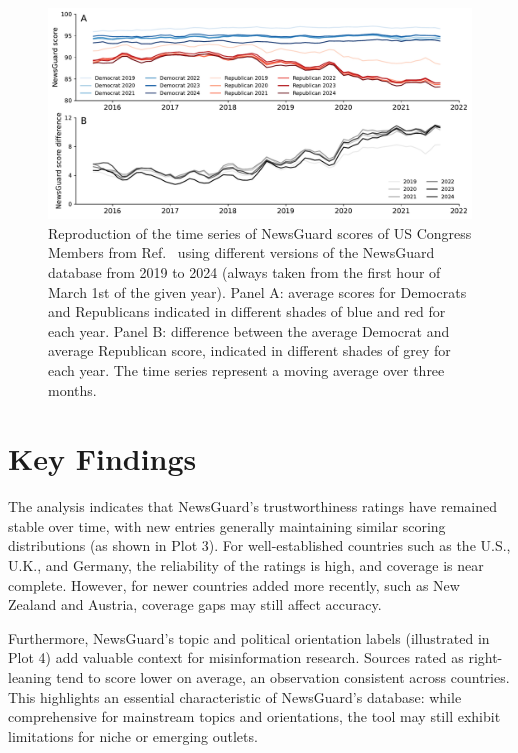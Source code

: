 \documentclass{article}
\begin{document}
\begin{figure}[H]
    \centering
    \includegraphics[width=\textwidth]{figures/politician_trustworthiness_replication_score_difference.pdf}
    \caption{Reproduction of the time series of NewsGuard scores of US Congress Members from Ref.~\cite{lasserSocialMediaSharing2022c} using different versions of the NewsGuard database from 2019 to 2024 (always taken from the first hour of March 1st of the given year). Panel A: average scores for Democrats and Republicans indicated in different shades of blue and red for each year. Panel B: difference between the average Democrat and average Republican score, indicated in different shades of grey for each year. The time series represent a moving average over three months.}
    \label{fig:reproduction}
\end{figure}

\section{Key Findings}
The analysis indicates that NewsGuard’s trustworthiness ratings have remained stable over time, with new entries generally maintaining similar scoring distributions (as shown in Plot 3). 
For well-established countries such as the U.S., U.K., and Germany, the reliability of the ratings is high, and coverage is near complete. 
However, for newer countries added more recently, such as New Zealand and Austria, coverage gaps may still affect accuracy.



Furthermore, NewsGuard’s topic and political orientation labels (illustrated in Plot 4) add valuable context for misinformation research. Sources rated as right-leaning tend to score lower on average, an observation consistent across countries. 
This highlights an essential characteristic of NewsGuard’s database: while comprehensive for mainstream topics and orientations, the tool may still exhibit limitations for niche or emerging outlets.
\end{document}
